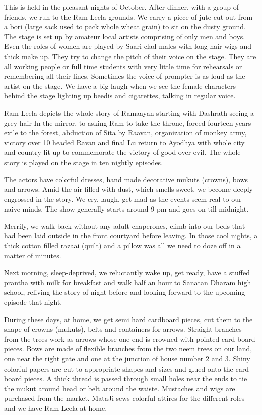 This is held in the pleasant nights of October. After dinner, with a group
of friends, we run to the Ram Leela grounds. We carry a piece of jute cut
out from a bori (large sack used to pack whole wheat grain) to sit on the
dusty ground. The stage is set up by amateur local artists comprising of
only men and boys. Even the roles of women are played by Saari clad males
with long hair wigs and thick make up. They try to change the pitch of
their voice on the stage. They are all working people or full time
students with very little time for rehearsals or remembering all their
lines. Sometimes the voice of prompter is as loud as the artist on the
stage. We have a big laugh when we see the female characters behind the
stage lighting up beedis  and cigarettes, talking in regular voice.  

Ram Leela depicts the whole story of Ramaayan starting with Dashrath
seeing a grey hair In the mirror, to asking Ram to take the throne, forced
fourteen years exile to the forest, abduction of Sita by Raavan,
organization of monkey army, victory over 10 headed Ravan and final Lu
return to Ayodhya with whole city and country lit up to commemorate the
victory of good over evil. The whole story is played on the stage in ten
nightly episodes.

 The actors have colorful dresses, hand made decorative mukuts (crowns),
 bows and arrows. Amid the air filled with dust, which smells sweet, we
 become deeply engrossed in the story. We cry, laugh, get mad as the
 events seem real to our naive minds. The show generally starts around
 9 pm and goes on till midnight. 

Merrily, we walk back without any adult chaperones, climb into our beds
that had been laid outside in the front courtyard before leaving. In those
cool nights, a thick cotton filled razaai (quilt) and a pillow was all we
need to doze off in a matter of minutes. 

Next morning, sleep-deprived, we reluctantly wake up, get ready, have
a stuffed prantha with milk for breakfast and walk half an hour to Sanatan
Dharam high school, reliving the story of night before and looking forward
to the upcoming episode that night. 

During these days, at home, we get semi hard cardboard pieces, cut them to
the shape of crowns (mukuts), belts and containers for arrows. Straight
branches from the trees work as arrows whose one end is crowned with
pointed card board pieces. Bows are made of flexible branches from the two
neem trees on our land, one near the right gate and one at the junction of
house number 2 and 3. Shiny colorful papers are cut to appropriate shapes
and sizes and glued onto the card board pieces. A thick thread is passed
through small holes near the ends to tie the mukut around head or belt
around the waiste. Mustaches and wigs are purchased from the market.
MataJi sews colorful attires for the different roles and we have Ram Leela
at home. 

